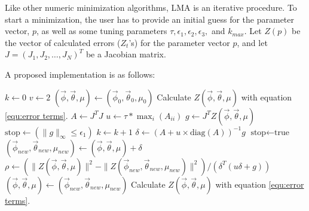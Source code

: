 Like other numeric minimization algorithms, LMA is an iterative
procedure.  To start a minimization, the user has to provide an
initial guess for the parameter vector, $p$, as well as some tuning
parameters $\tau, \epsilon_1, \epsilon_2, \epsilon_3,$ and $k_{max}$.
Let $Z(p)$ be the vector of calculated errors ($Z_t$'s) for the
parameter vector $p$, and let $J = (J_{1}, J_{2}, \dots, J_N)^T$
be a Jacobian matrix.   

A proposed implementation is as follows:
\begin{algorithm}
\begin{algorithmic}[1]
	\State $k \leftarrow 0$  
	\State $v \leftarrow 2$ 
	\State $(\vec{\phi},\vec{\theta},\mu) \leftarrow (\vec{\phi}_0,\vec{\theta}_0,\mu_0)$ 
	\State Calculate $Z(\vec{\phi},\vec{\theta},\mu)$ with equation \ref{equ:error terms}.  
	\State $A \leftarrow J^T J$   
	\State $u \leftarrow \tau * \max_i(A_{ii})$ 
	\State $g \leftarrow J^T Z(\vec{\phi},\vec{\theta},\mu)$ 
	\State $ \text{stop} \leftarrow (\|g\|_{\infty} \le \epsilon_1)$ 
		\State $k \leftarrow k + 1$
		\Repeat
			\State $\delta \leftarrow (A + u \times \text{diag}(A))^{-1} g$ 
			 
				\State  $\text{stop} \leftarrow \text{true}$
			\Else
				\State $(\vec{\phi}_{new},\vec{\theta}_{new},\mu_{new}) \leftarrow (\vec{\phi},\vec{\theta},\mu) + \delta$ 
				\State $\rho \leftarrow (\| Z(\vec{\phi},\vec{\theta},\mu)\|^2 - \| Z(\vec{\phi}_{new},\vec{\theta}_{new},\mu_{new})\|^2 )/(\delta^T(u \delta + g))$ 
				 
					\State $(\vec{\phi},\vec{\theta},\mu) \leftarrow (\vec{\phi}_{new},\vec{\theta}_{new},\mu_{new})$ 
					\State Calculate $Z(\vec{\phi},\vec{\theta},\mu)$ with equation \ref{equ:error terms}.  

\end{algorithmic}
\end{algorithm}
